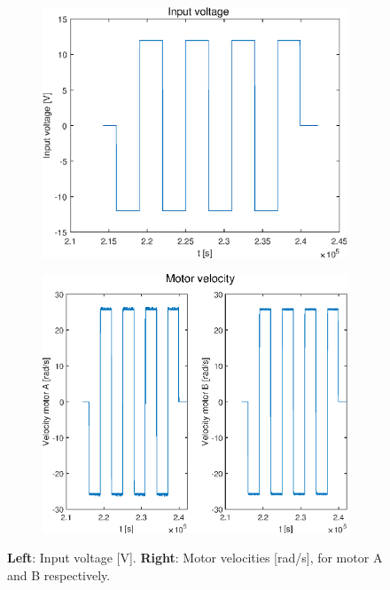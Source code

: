 \documentclass[a4paper,kul]{kulakarticle} %
\begin{document}
\begin{figure}[htp!]
	\centering
	\begin{subfigure}[b]{0.485\textwidth}
		\centering
		\includegraphics[width=\textwidth]{input_voltage.eps}
	\end{subfigure}
	\hfill
	\begin{subfigure}[b]{0.5\textwidth}  
		\centering 
		\includegraphics[width=\textwidth]{motor_velocity.eps}
	\end{subfigure}
	\caption{\textbf{Left}: Input voltage [V]. \textbf{Right}: Motor velocities [rad/s], for motor A and B respectively.} 
	\label{fig:IO}
\end{figure}
\end{document}
